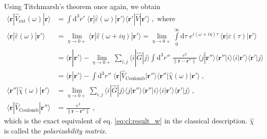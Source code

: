 \documentclass[a4paper,12pt]{article}
\begin{document}
    Using Titchmarsh's theorem once again, we obtain
    \begin{equation} \label{eq:qm:result_w}
    \begin{aligned}
        \langle \mathbf{r} | \hat V_\text{ext}(\omega) | \mathbf{r} \rangle &= \int\!\! \text{d}^3 r' \; \langle \mathbf{r} | \hat \varepsilon(\omega) | \mathbf{r'} \rangle \langle \mathbf{r'} | \hat V | \mathbf{r'} \rangle \; , \text{ where} \\
        \langle \mathbf{r} | \hat \varepsilon(\omega) | \mathbf{r'} \rangle 
            &= \lim_{\eta \to 0+} \langle \mathbf{r} | \hat\varepsilon(\omega + i\eta) | \mathbf{r'} \rangle = \lim_{\eta \to 0+} \int\limits_{0}^{\infty} \!\! \text{d}\tau \; e^{i (\omega +i\eta) \tau}\,\langle \mathbf{r} | \varepsilon(\tau) | \mathbf{r'} \rangle \\
            &= \langle \mathbf{r} | \mathbf{r'} \rangle - \lim_{\eta \to 0+} \sum_{i,j} \langle i | \hat G | j \rangle \!\! \int\!\! \text{d}^3 r'' \; \frac{e^2}{\| \mathbf{r} - \mathbf{r''} \|} \, \langle j |\mathbf{r''}\rangle \langle\mathbf{r''} | i \rangle \langle i | \mathbf{r'}\rangle \langle \mathbf{r'} | j \rangle \\
            &= \langle \mathbf{r} | \mathbf{r'} \rangle - \int\!\! \text{d}^3 r'' \;  \langle \mathbf{r} | \hat V_\text{Coulomb} | \mathbf{r''} \rangle \langle \mathbf{r''} | \hat\chi(\omega) | \mathbf{r'} \rangle\; , \\
        \langle \mathbf{r''} | \hat\chi(\omega) | \mathbf{r'} \rangle 
            &= \lim_{\eta \to 0+} \sum_{i,j} \langle i | \hat G | j \rangle \langle j |\mathbf{r''}\rangle \langle\mathbf{r''} | i \rangle \langle i | \mathbf{r'}\rangle \langle \mathbf{r'} | j \rangle \; , \\
        \langle \mathbf{r} | \hat V_\text{Coulomb} | \mathbf{r''} \rangle &= \frac{e^2}{\|\mathbf{r} - \mathbf{r''}\|}\; ,
    \end{aligned}
    \end{equation}
    which is the exact equivalent of eq. \eqref{eq:cl:result_w} in the classical description. $\hat\chi$ is called the \textit{polarizability matrix}.

\newpage
\end{document}
